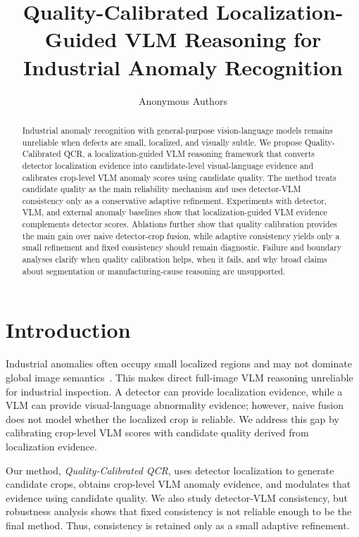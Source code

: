 \documentclass[10pt]{article}
\title{Quality-Calibrated Localization-Guided VLM Reasoning for Industrial Anomaly Recognition}
\author{Anonymous Authors}
\date{}
\begin{document}
\maketitle

\begin{abstract}
Industrial anomaly recognition with general-purpose vision-language models remains unreliable when defects are small, localized, and visually subtle.
We propose Quality-Calibrated QCR, a localization-guided VLM reasoning framework that converts detector localization evidence into candidate-level visual-language evidence and calibrates crop-level VLM anomaly scores using candidate quality.
The method treats candidate quality as the main reliability mechanism and uses detector-VLM consistency only as a conservative adaptive refinement.
Experiments with detector, VLM, and external anomaly baselines show that localization-guided VLM evidence complements detector scores.
Ablations further show that quality calibration provides the main gain over naive detector-crop fusion, while adaptive consistency yields only a small refinement and fixed consistency should remain diagnostic.
Failure and boundary analyses clarify when quality calibration helps, when it fails, and why broad claims about segmentation or manufacturing-cause reasoning are unsupported.
\end{abstract}

\section{Introduction}

Industrial anomalies often occupy small localized regions and may not dominate global image semantics~\cite{Bergmann2019MVTecAD,Zou2022VisA}.
This makes direct full-image VLM reasoning unreliable for industrial inspection.
A detector can provide localization evidence, while a VLM can provide visual-language abnormality evidence; however, naive fusion does not model whether the localized crop is reliable.
We address this gap by calibrating crop-level VLM scores with candidate quality derived from localization evidence.

Our method, \emph{Quality-Calibrated QCR}, uses detector localization to generate candidate crops, obtains crop-level VLM anomaly evidence, and modulates that evidence using candidate quality.
We also study detector-VLM consistency, but robustness analysis shows that fixed consistency is not reliable enough to be the final method.
Thus, consistency is retained only as a small adaptive refinement.
\end{document}
